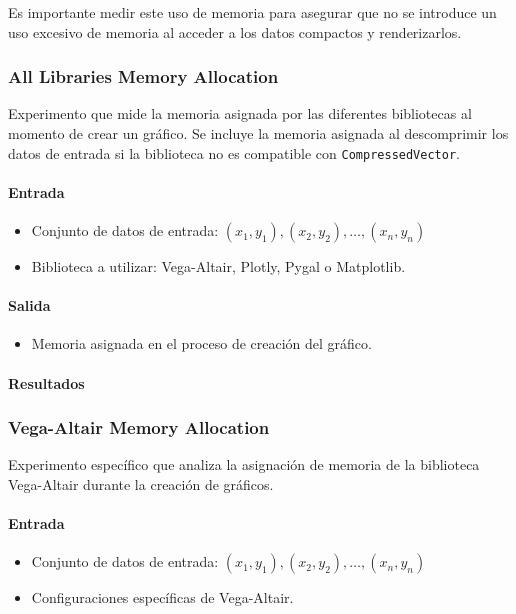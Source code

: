 Es importante medir este uso de memoria para asegurar que no se introduce un uso excesivo de memoria al acceder a los datos compactos y renderizarlos.

\subsubsection{All Libraries Memory Allocation}
\label{all_libraries_memory_allocation}

Experimento que mide la memoria asignada por las diferentes bibliotecas al momento de crear un gráfico. Se incluye la memoria asignada al descomprimir los datos de entrada si la biblioteca no es compatible con \texttt{CompressedVector}.

\paragraph{Entrada}
\begin{itemize}
    \item Conjunto de datos de entrada: \( (x_1, y_1), (x_2, y_2), \ldots, (x_n, y_n) \)
    \item Biblioteca a utilizar: Vega-Altair, Plotly, Pygal o Matplotlib.
\end{itemize}

\paragraph{Salida}
\begin{itemize}
    \item Memoria asignada en el proceso de creación del gráfico.
\end{itemize}

\newpage
\paragraph{Resultados}
\vspace{0.5em}
\noindent
\AllLibrariesMemoryAllocation
\newpage


\subsubsection{Vega-Altair Memory Allocation}
\label{vega_altair_memory_allocation}

Experimento específico que analiza la asignación de memoria de la biblioteca Vega-Altair durante la creación de gráficos.

\paragraph{Entrada}
\begin{itemize}
    \item Conjunto de datos de entrada: \( (x_1, y_1), (x_2, y_2), \ldots, (x_n, y_n) \)
    \item Configuraciones específicas de Vega-Altair.
\end{itemize}

